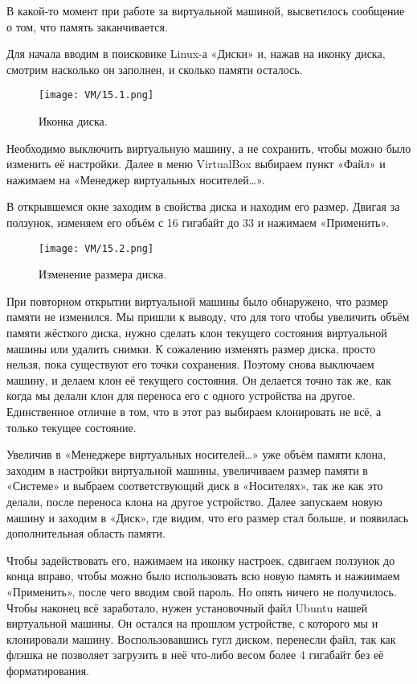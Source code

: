 
\quad В какой-то момент при работе за виртуальной машиной, высветилось сообщение о том, что память заканчивается. 

\quad Для начала вводим в поисковике Linux-а «Диски» и, нажав на иконку диска, смотрим насколько он заполнен, и сколько памяти осталось. 

\begin{figure}[h]
		\centering
		\texttt{[image: VM/15.1.png]}
\caption{Иконка диска.}
\label{ris:image}
\end{figure}

\quad Необходимо выключить виртуальную машину, а не сохранить, чтобы можно было изменить её настройки. Далее в меню VirtualBox выбираем пункт «Файл» и нажимаем на «Менеджер виртуальных носителей…».

\quad В открывшемся окне заходим в свойства диска и находим его размер. Двигая за ползунок, изменяем его объём с 16 гигабайт до 33 и нажимаем «Применить». 

\begin{figure}[h]
		\centering
		\texttt{[image: VM/15.2.png]}
\caption{Изменение размера диска.}
\label{ris:image}
\end{figure}

\quad При повторном открытии виртуальной машины было обнаружено, что размер памяти не изменился. Мы пришли к выводу, что для того чтобы увеличить объём памяти жёсткого диска, нужно сделать клон текущего состояния виртуальной машины или удалить снимки. К сожалению изменять размер диска, просто нельзя, пока существуют его точки сохранения. Поэтому снова выключаем машину, и делаем клон её текущего состояния. Он делается точно так же, как когда мы делали клон для переноса его с одного устройства на другое. Единственное отличие в том, что в этот раз выбираем клонировать не всё, а только текущее состояние. 

\quad Увеличив в «Менеджере виртуальных носителей…» уже объём памяти клона, заходим в настройки виртуальной машины, увеличиваем размер памяти в «Системе» и выбраем соответствующий диск в «Носителях», так же как это делали, после переноса клона на другое устройство. Далее запускаем новую машину и заходим в «Диск», где видим, что его размер стал больше, и появилась дополнительная область памяти.

\quad Чтобы задействовать его, нажимаем на иконку настроек, сдвигаем ползунок до конца вправо, чтобы можно было использовать всю новую память и нажиимаем «Применить», после чего вводим свой пароль. Но опять ничего не получилось. Чтобы наконец всё заработало, нужен установочный файл Ubuntu нашей виртуальной машины. Он остался на прошлом устройстве, с которого мы и клонировали машину. Воспользовавшись гугл диском, перенесли файл, так как флэшка не позволяет загрузить в неё что-либо весом более 4 гигабайт без её форматирования.

